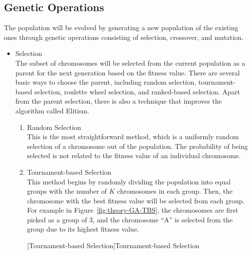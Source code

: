 \documentclass[12pt,oneside,openright,a4paper]{cpe-english-project}
\begin{document}
\subsection{Genetic Operations}
The population will be evolved by generating a new population of the existing ones through genetic operations consisting of selection, crossover, and mutation.
\begin{itemize}
	\item Selection \\
	The subset of chromosomes will be selected from the current population as a parent for the next generation based on the fitness value. There are several basic ways to choose the parent, including random selection, tournament-based selection, roulette wheel selection, and ranked-based selection. Apart from the parent selection, there is also a technique that improves the algorithm called Elitism.
	\begin{enumerate}
		\item Random Selection \\
		This is the most straightforward method, which is a uniformly random selection of a chromosome out of the population. The probability of being selected is not related to the fitness value of an individual chromosome.
		\item Tournament-based Selection \\
		This method begins by randomly dividing the population into equal groups with the number of $K$ chromosomes in each group. Then, the chromosome with the best fitness value will be selected from each group. For example in Figure~\ref{fig:theory-GA-TBS}, the chromosomes are first picked as a group of 3, and the chromosome ``A'' is selected from the group due to its highest fitness value.
		
		\begin{minipage}[c]{\textwidth}\centering
		[Tournament-based Selection]{Tournament-based Selection \cite{immanuel2019genetic}}
		\label{fig:theory-GA-TBS}
		\end{minipage}


\end{enumerate}
\end{itemize}
\end{document}
